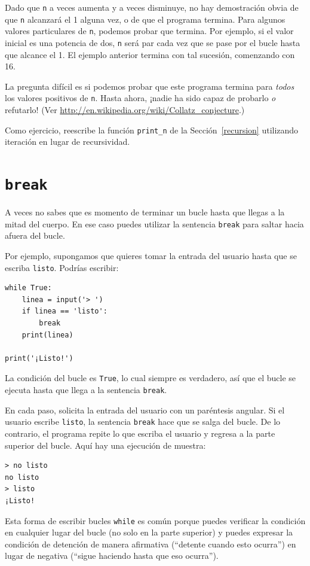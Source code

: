 \documentclass[10pt]{book}
\begin{document}
Dado que {\tt n} a veces aumenta y a veces disminuye, no hay
demostración obvia de que {\tt n} alcanzará el 1 alguna vez, o de que el programa
termina.  Para algunos valores particulares de {\tt n}, podemos probar que
termina.  Por ejemplo, si el valor inicial es una potencia de dos,
{\tt n} será par cada vez que se pase por el bucle
hasta que alcance el 1. El ejemplo anterior termina con tal sucesión,
comenzando con 16.

La pregunta difícil es si podemos probar que este programa termina
para {\em todos} los valores positivos de {\tt n}.  Hasta ahora, ¡nadie ha
sido capaz de probarlo {\em o} refutarlo!  (Ver
  \url{http://en.wikipedia.org/wiki/Collatz_conjecture}.)

Como ejercicio, reescribe la función \verb"print_n" de la
Sección~\ref{recursion} utilizando iteración en lugar de recursividad.


\section{{\tt break}}

A veces no sabes que es momento de terminar un bucle hasta que llegas a la mitad
del cuerpo.  En ese caso puedes utilizar la sentencia {\tt break}
para saltar hacia afuera del bucle.

Por ejemplo, supongamos que quieres tomar la entrada del usuario hasta que
se escriba {\tt listo}.    Podrías escribir:

\begin{verbatim}
while True:
    linea = input('> ')
    if linea == 'listo':
        break
    print(linea)

print('¡Listo!')
\end{verbatim}
%
La condición del bucle es {\tt True}, lo cual siempre es verdadero, así que el
bucle se ejecuta hasta que llega a la sentencia {\tt break}.

En cada paso, solicita la entrada del usuario con un paréntesis angular.
Si el usuario escribe {\tt listo}, la sentencia {\tt break} hace que se salga
del bucle.  De lo contrario, el programa repite lo que escriba el usuario
y regresa a la parte superior del bucle.  Aquí hay una ejecución de muestra:

\begin{verbatim}
> no listo
no listo
> listo
¡Listo!
\end{verbatim}
%
Esta forma de escribir bucles {\tt while} es común porque puedes
verificar la condición en cualquier lugar del bucle (no solo en la
parte superior) y puedes expresar la condición de detención de manera afirmativa
(``detente cuando esto ocurra'') en lugar de negativa (``sigue haciendo
hasta que eso ocurra'').
\end{document}
